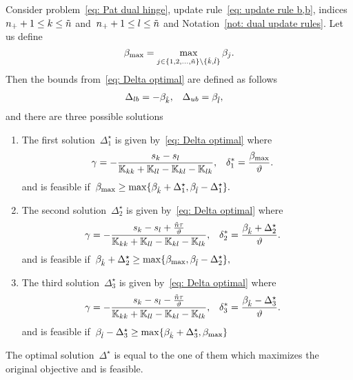 \begin{lemma}
  Consider problem~\eqref{eq: Pat dual hinge}, update rule~\eqref{eq: update rule b,b}, indices~$n_{+} + 1 \leq k \leq \tilde{n}$ and~$n_{+} + 1 \leq l \leq \tilde{n}$ and Notation~\ref{not: dual update rules}. Let us define
  \begin{equation*}
    \beta_{\max} = \max_{j \in \{1, 2, \ldots, \tilde{n} \} \setminus \{\hat{k}, \hat{l}\}} \beta_j.
  \end{equation*}
  Then the bounds from~\eqref{eq: Delta optimal} are defined as follows
  \begin{align*}
    \Delta_{lb} & = - \beta_{\hat{k}}, &
    \Delta_{ub} & = \beta_{\hat{l}},
  \end{align*}
  and there are three possible solutions
  \begin{enumerate}
    \item The first solution~$\Delta^{\star}_1$ is given by~\eqref{eq: Delta optimal} where
    \begin{align*}
      \gamma
        & = -\frac{s_k - s_l}{\mathbb{K}_{kk} + \mathbb{K}_{ll} - \mathbb{K}_{kl} - \mathbb{K}_{lk}}, &
      \delta^{*}_1
        & = \frac{\beta_{\max}}{\vartheta}.
    \end{align*}
    and is feasible if~$\beta_{\max} \geq \max\{\beta_{\hat{k}} + \Delta^{\star}_1, \beta_{\hat{l}} - \Delta^{\star}_1\}.$
    \item The second solution~$\Delta^{\star}_2$ is given by~\eqref{eq: Delta optimal} where
    \begin{align*}
      \gamma
        & = -\frac{s_k - s_l + \frac{\tilde{n} \tau}{\vartheta}}{\mathbb{K}_{kk} + \mathbb{K}_{ll} - \mathbb{K}_{kl} - \mathbb{K}_{lk}}, &
      \delta^{*}_2
        & = \frac{\beta_{\hat{k}} + \Delta^{\star}_2}{\vartheta}.
    \end{align*}
    and is feasible if~$\beta_{\hat{k}} + \Delta^{\star}_2 \geq \max\{\beta_{\max} , \beta_{\hat{l}} - \Delta^{\star}_2\},$
    \item The third solution~$\Delta^{\star}_3$ is given by~\eqref{eq: Delta optimal} where
    \begin{align*}
      \gamma
        & = -\frac{s_k - s_l - \frac{\tilde{n} \tau}{\vartheta}}{\mathbb{K}_{kk} + \mathbb{K}_{ll} - \mathbb{K}_{kl} - \mathbb{K}_{lk}}, &
      \delta^{*}_3
        & = \frac{\beta_{\hat{k}} - \Delta^{\star}_3}{\vartheta}.
    \end{align*}
    and is feasible if~$\beta_{\hat{l}} - \Delta^{\star}_3 \geq \max\{\beta_{\hat{k}} + \Delta^{\star}_3, \beta_{\max}\}$
  \end{enumerate}
  The optimal solution~$\Delta^{\star}$ is equal to the one of them which maximizes the original objective and is feasible.
\end{lemma}

